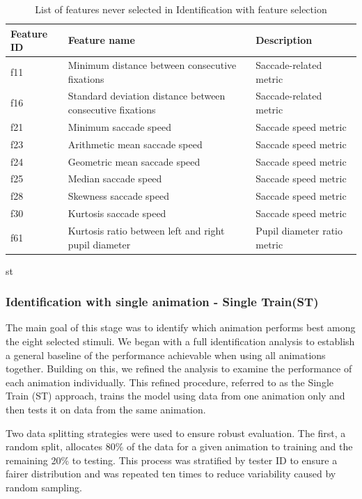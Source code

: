 \documentclass{article}
\begin{document}
\begin{table}[H]
\centering
\small
\setlength{\tabcolsep}{4pt} %
\caption{List of features never selected in Identification with feature selection}
\label{tab:ns_id}
\begin{tabular}{lll}
\toprule
\textbf{Feature ID} & \textbf{Feature name} & \textbf{Description} \\
\midrule
f11 & Minimum distance between consecutive fixations & Saccade-related metric \\
f16 & Standard deviation distance between consecutive fixations & Saccade-related metric \\
f21 & Minimum saccade speed & Saccade speed metric \\
f23 & Arithmetic mean saccade speed & Saccade speed metric \\
f24 & Geometric mean saccade speed & Saccade speed metric \\
f25 & Median saccade speed & Saccade speed metric \\
f28 & Skewness saccade speed & Saccade speed metric \\
f30 & Kurtosis saccade speed & Saccade speed metric \\
f61 & Kurtosis ratio between left and right pupil diameter & Pupil diameter ratio metric \\
\bottomrule
\end{tabular}st
\end{table}
\FloatBarrier


\subsubsection{Identification with single animation - Single Train(ST)}
\label{subsec:id_s_st}

The main goal of this stage was to identify which animation performs best among the eight selected stimuli. 
We began with a full identification analysis to establish a general baseline of the performance achievable when using all animations together. 
Building on this, we refined the analysis to examine the performance of each animation individually. 
This refined procedure, referred to as the Single Train (ST) approach, trains the model using data from one animation only and then tests it on data from the same animation.

Two data splitting strategies were used to ensure robust evaluation. 
The first, a random split, allocates 80\% of the data for a given animation to training and the remaining 20\% to testing.
This process was stratified by tester ID to ensure a fairer distribution and was repeated ten times to reduce variability caused by random sampling.
\end{document}
